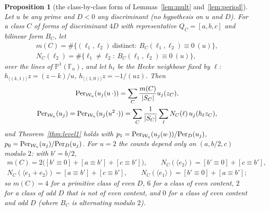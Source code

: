 \documentclass[11pt,a4paper]{article}
\newtheorem{proposition}[theorem]{Proposition}
\theoremstyle{remark}\newtheorem{remark}[theorem]{Remark}
\begin{document}
\begin{proposition}[the class-by-class form of Lemmas~\ref{lem:mult} and~\ref{lem:period}]\label{prop:classwise}
Let $u$ be any prime and $D<0$ any discriminant (no hypothesis on $u$ and $D$). For a class $C$ of forms of discriminant $4D$
with representative $Q_C=[a,b,c]$ and bilinear form $B_C$, let
\begin{gather*}
m(C)=\#\{(\ell_1,\ell_2)\ \text{distinct}:\ B_C(\ell_1,\ell_2)\equiv0\ (u)\},\\
N_C(\ell_2)=\#\{\ell_1\ne\ell_2:\ B_C(\ell_1,\ell_2)\equiv0\ (u)\},
\end{gather*}
over the lines of $\mathbb P^1(\mathbb F_u)$, and let $h_\ell$ be the Hecke neighbour fixed by $\ell$: $h_{\langle(k,1)\rangle}z=(z-k)/u$,
$h_{\langle(1,0)\rangle}z=-1/(uz)$. Then
\begin{gather*}
\mathrm{Per}_{\mathcal W_u}(u_j(u\,\cdot))=\sum_C\frac{m(C)}{|S_C|}u_j(z_C),\\
\mathrm{Per}_{\mathcal W_u}(u_j)=\mathrm{Per}_{\mathcal W_u}(u_j(u^2\,\cdot))=\sum_C\frac1{|S_C|}\sum_{\ell}N_C(\ell)\,u_j(h_\ell z_C),
\end{gather*}
and Theorem~\ref{thm:level1} holds with $p_1=\mathrm{Per}_{\mathcal W_u}(u_j(u\cdot))/\mathrm{Per}_D(u_j)$, $p_0=\mathrm{Per}_{\mathcal W_u}(u_j)/\mathrm{Per}_D(u_j)$.
For $u=2$ the counts depend only on $(a,b/2,c)$ modulo $2$: with $b'=b/2$,
\begin{gather*}
m(C)=2\bigl([b'\equiv0]+[a\equiv b']+[c\equiv b']\bigr),\qquad N_C(\langle e_2\rangle)=[b'\equiv0]+[c\equiv b'],\\
N_C(\langle e_1+e_2\rangle)=[a\equiv b']+[c\equiv b'],\qquad N_C(\langle e_1\rangle)=[b'\equiv0]+[a\equiv b'];
\end{gather*}
so $m(C)=4$ for a primitive class of even $D$, $6$ for a class of even content, $2$ for a class of odd $D$ that is not of even content,
and $0$ for a class of even content and odd $D$ (where $B_C$ is alternating modulo $2$).
\end{proposition}
\end{document}

